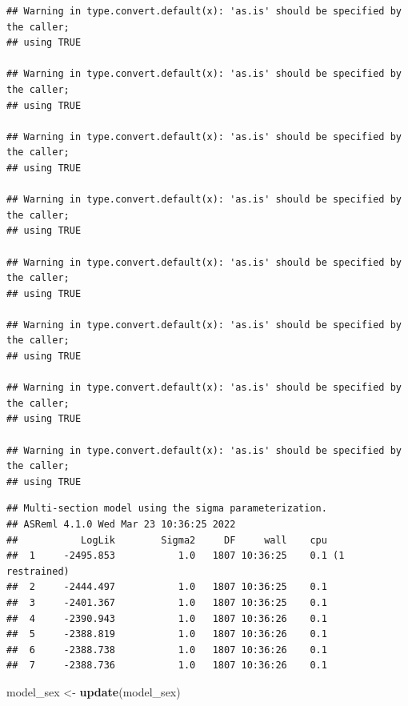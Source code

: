 \documentclass[
  12pt,
]{book}
\newenvironment{Shaded}{\begin{snugshade}}{\end{snugshade}}
\newcommand{\KeywordTok}[1]{\textcolor[rgb]{0.13,0.29,0.53}{\textbf{#1}}}
\newcommand{\NormalTok}[1]{#1}
\newcommand{\StringTok}[1]{\textcolor[rgb]{0.31,0.60,0.02}{#1}}
\begin{document}
\begin{verbatim}
## Warning in type.convert.default(x): 'as.is' should be specified by the caller;
## using TRUE

## Warning in type.convert.default(x): 'as.is' should be specified by the caller;
## using TRUE

## Warning in type.convert.default(x): 'as.is' should be specified by the caller;
## using TRUE

## Warning in type.convert.default(x): 'as.is' should be specified by the caller;
## using TRUE

## Warning in type.convert.default(x): 'as.is' should be specified by the caller;
## using TRUE

## Warning in type.convert.default(x): 'as.is' should be specified by the caller;
## using TRUE

## Warning in type.convert.default(x): 'as.is' should be specified by the caller;
## using TRUE

## Warning in type.convert.default(x): 'as.is' should be specified by the caller;
## using TRUE
\end{verbatim}

\begin{verbatim}
## Multi-section model using the sigma parameterization.
## ASReml 4.1.0 Wed Mar 23 10:36:25 2022
##           LogLik        Sigma2     DF     wall    cpu
##  1     -2495.853           1.0   1807 10:36:25    0.1 (1 restrained)
##  2     -2444.497           1.0   1807 10:36:25    0.1
##  3     -2401.367           1.0   1807 10:36:25    0.1
##  4     -2390.943           1.0   1807 10:36:26    0.1
##  5     -2388.819           1.0   1807 10:36:26    0.1
##  6     -2388.738           1.0   1807 10:36:26    0.1
##  7     -2388.736           1.0   1807 10:36:26    0.1
\end{verbatim}

\begin{Shaded}
\begin{Highlighting}[]
\NormalTok{model\_sex \textless{}{-}}\StringTok{ }\KeywordTok{update}\NormalTok{(model\_sex)}
\end{Highlighting}
\end{Shaded}
\end{document}
